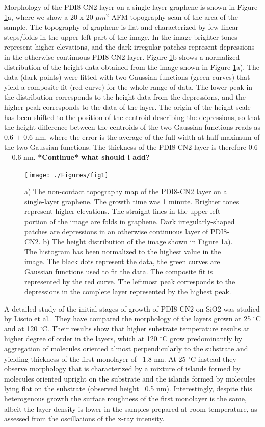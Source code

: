 \documentclass[preprint,aip,jap]{revtex4-2}
\begin{document}
Morphology of the PDI8-CN2 layer on a single layer graphene is shown in Figure \ref{fig:1}a, where we show a 20 x 20 $\mu m^2$ AFM topography scan of the area of the sample. The topography of graphene is flat and characterized by few linear steps/folds in the upper left part of the image. In the image brighter tones represent higher elevations, and the dark irregular patches represent depressions in the otherwise continuous PDI8-CN2 layer. Figure \ref{fig:1}b  shows a normalized distribution of the height data obtained from the image shown in Figure \ref{fig:1}a). The data (dark points) were fitted with two Gaussian functions (green curves) that yield a composite fit (red curve) for the whole range of data. The lower peak in the distribution corresponds to the height data from the depressions, and the higher peak corresponds to the data of the layer. The origin of the height scale has been shifted to the position of the centroid describing the depressions, so that the height difference between the centroids of the two Gaussian functions reads as 0.6 $\pm$ 0.6 nm, where the error is the average of the full-width at half maximum of the two Gaussian functions.  The thickness of the PDI8-CN2 layer is therefore 0.6 $\pm$ 0.6 nm.\textbf{ *Continue*   what should i add? }
\begin{figure}[htb]
  \centering
        \texttt{[image: ./Figures/fig1]}
  \caption{a) The non-contact topography map of the PDI8-CN2 layer on a single-layer graphene. The growth time was 1 minute. Brighter tones represent higher elevations. The straight lines in the upper left portion of the image are folds in graphene. Dark irregularly-shaped patches are depressions in an otherwise continuous layer of PDI8-CN2.  b) The height distribution of the image shown in Figure 1a). The histogram has been normalized to the highest value in the image. The black dots represent the data, the green curves are Gaussian functions used to fit the data. The composite fit is represented by the red curve. The leftmost peak corresponds to the depressions in the complete layer represented by the highest peak.}
  \label{fig:1}
\end{figure}

 
A detailed study of the initial stages of growth of PDI8-CN2 on SiO2 was studied by Liscio et al.\cite{liscio-2013}. They have compared the morphology of the layers grown at 25 $^\circ$C and at 120 $^\circ$C. Their results show that higher substrate temperature results at higher degree of order in the layers, which at 120 $^\circ$C grow predominantly by aggregation of molecules oriented almost perpendicularly to the substrate and yielding thickness of the first monolayer of ~1.8 nm. At 25 $^\circ$C instead they observe morphology that is characterized by a mixture of islands formed by molecules oriented upright on the substrate and the islands formed by molecules lying flat on the substrate (observed height ~0.5 nm). Interestingly, despite this heterogenous growth the surface roughness of the first monolayer is the same, albeit the layer density is lower in the samples prepared at room temperature, as assessed from the oscillations of the x-ray intensity. 
\end{document}
